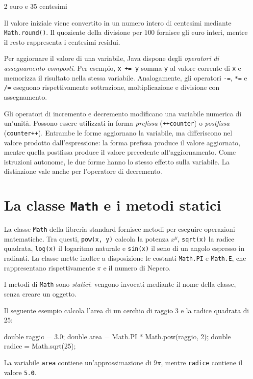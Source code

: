 

\begin{unipdterminal}
2 euro e 35 centesimi
\end{unipdterminal}

Il valore iniziale viene convertito in un numero intero
di centesimi mediante \texttt{Math.round()}. Il quoziente della
divisione per \(100\) fornisce gli euro interi, mentre
il resto rappresenta i centesimi residui.

Per aggiornare il valore di una variabile, Java dispone
degli \emph{operatori di assegnamento composti}.
Per esempio, \texttt{x += y} somma \texttt{y} al valore
corrente di \texttt{x} e memorizza il risultato nella
stessa variabile. Analogamente, gli operatori
\texttt{-=}, \texttt{*=} e \texttt{/=} eseguono
rispettivamente sottrazione, moltiplicazione e divisione
con assegnamento.

Gli operatori di incremento e decremento modificano
una variabile numerica di un'unità. Possono essere
utilizzati in forma \emph{prefissa}
(\texttt{++counter}) o \emph{postfissa}
(\texttt{counter++}). Entrambe le forme aggiornano
la variabile, ma differiscono nel valore prodotto
dall'espressione: la forma prefissa produce il
valore aggiornato, mentre quella postfissa produce
il valore precedente all'aggiornamento.
Come istruzioni autonome, le due forme hanno lo stesso
effetto sulla variabile. La distinzione vale anche
per l'operatore di decremento.

\clearpage

\section{La classe \texttt{Math} e i metodi statici}
\label{sec:fi-java-math}

La classe \texttt{Math} della libreria standard fornisce metodi
per eseguire operazioni matematiche. Tra questi,
\texttt{pow(x, y)} calcola la potenza \(x^y\),
\texttt{sqrt(x)} la radice quadrata, \texttt{log(x)}
il logaritmo naturale e \texttt{sin(x)} il seno di un
angolo espresso in radianti. La classe mette inoltre
a disposizione le costanti \texttt{Math.PI} e
\texttt{Math.E}, che rappresentano rispettivamente
\(\pi\) e il numero di Nepero.

I metodi di \texttt{Math} sono \emph{statici}: vengono
invocati mediante il nome della classe, senza creare
un oggetto.

\begin{example}
Il seguente esempio calcola l'area di un cerchio
di raggio \(3\) e la radice quadrata di \(25\):

\begin{unipdcode}[language=Java]
double raggio = 3.0;
double area = Math.PI * Math.pow(raggio, 2);
double radice = Math.sqrt(25);
\end{unipdcode}

La variabile \texttt{area} contiene un'approssimazione
di \(9\pi\), mentre \texttt{radice} contiene
il valore \texttt{5.0}.
\end{example}

